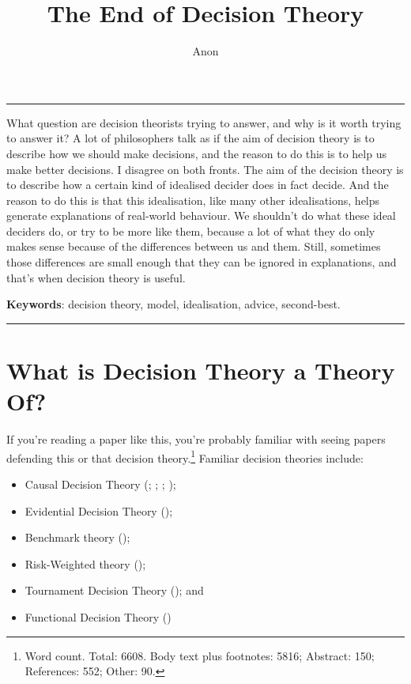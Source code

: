 \documentclass[
  12pt,
  letterpaper,
  DIV=11,
  numbers=noendperiod,
  twoside]{scrartcl}
\title{The End of Decision Theory}
\author{Anon}
\date{}
\providecommand{\tightlist}{%
  \setlength{\itemsep}{0pt}\setlength{\parskip}{0pt}}
\renewenvironment{abstract}
 {\vspace{-1.25cm}
 \quotation\small\noindent\rule{\linewidth}{.5pt}\par\smallskip
 \noindent }
 {\par\noindent\rule{\linewidth}{.5pt}\endquotation}
\begin{document}
\maketitle
\begin{abstract}
What question are decision theorists trying to answer, and why is it
worth trying to answer it? A lot of philosophers talk as if the aim of
decision theory is to describe how we should make decisions, and the
reason to do this is to help us make better decisions. I disagree on
both fronts. The aim of the decision theory is to describe how a certain
kind of idealised decider does in fact decide. And the reason to do this
is that this idealisation, like many other idealisations, helps generate
explanations of real-world behaviour. We shouldn't do what these ideal
deciders do, or try to be more like them, because a lot of what they do
only makes sense because of the differences between us and them. Still,
sometimes those differences are small enough that they can be ignored in
explanations, and that's when decision theory is useful.

\textbf{Keywords}: decision theory, model, idealisation, advice,
second-best.
\end{abstract}


\section{What is Decision Theory a Theory
Of?}\label{what-is-decision-theory-a-theory-of}

If you're reading a paper like this, you're probably familiar with
seeing papers defending this or that decision theory.\footnote{Word
  count. Total: 6608. Body text plus footnotes: 5816; Abstract: 150;
  References: 552; Other: 90.} Familiar decision theories include:

\begin{itemize}
\tightlist
\item
  Causal Decision Theory (; ;
  ; );
\item
  Evidential Decision Theory ();
\item
  Benchmark theory ();
\item
  Risk-Weighted theory ();
\item
  Tournament Decision Theory (); and
\item
  Functional Decision Theory
  ()
\end{itemize}
\end{document}

